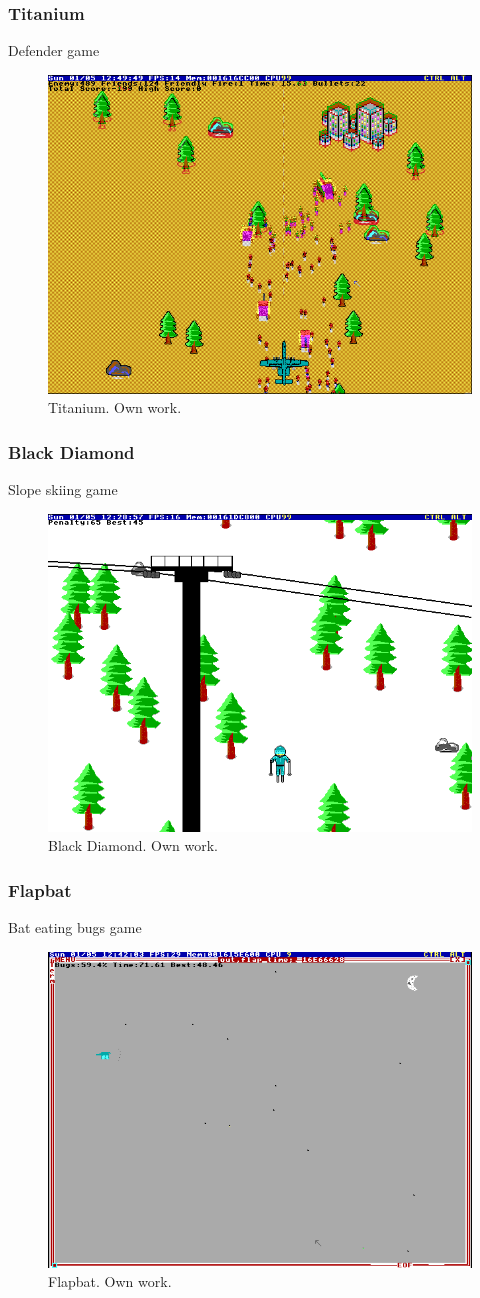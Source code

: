 \documentclass{beamer}
\begin{document}
	\begin{frame}
		\frametitle{Titanium}
		Defender game
		\begin{figure}
			\centering
			\includegraphics[width=0.6\linewidth]{images/titanium.png}
			\caption{Titanium. Own work.}
			\label{fig:titanium}
		\end{figure}
	\end{frame}

	\begin{frame}
		\frametitle{Black Diamond}
		Slope skiing game
		\begin{figure}
			\centering
			\includegraphics[width=0.6\linewidth]{images/black_diamond.png}
			\caption{Black Diamond. Own work.}
			\label{fig:black_diamond}
		\end{figure}
	\end{frame}

	\begin{frame}
		\frametitle{Flapbat}
		Bat eating bugs game
		\begin{figure}
			\centering
			\includegraphics[width=0.6\linewidth]{images/flapbat.png}
			\caption{Flapbat. Own work.}
			\label{fig:flapbat}
		\end{figure}
	\end{frame}
\end{document}
